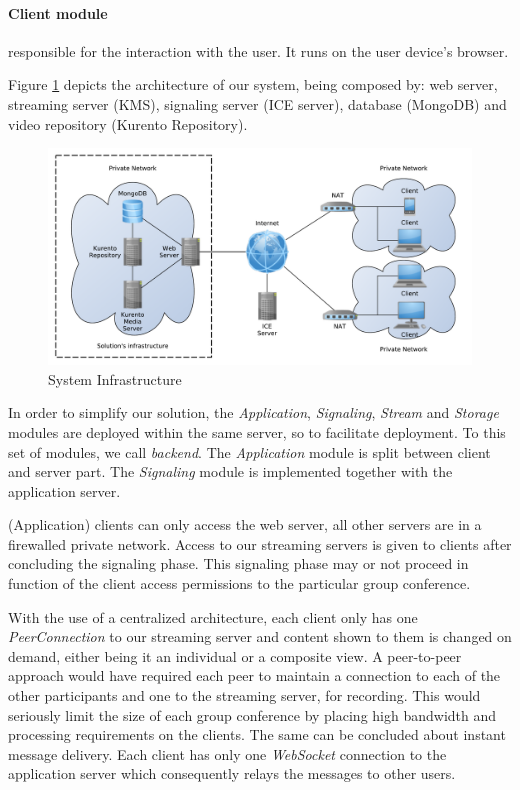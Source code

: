 \documentclass[10pt,conference]{IEEEtran}
\begin{document}
\paragraph{Client module} responsible for the interaction with the user. It runs on the user device's browser.


Figure \ref{fig:infrastructure} depicts the architecture of our system, being composed by: web server, streaming server (\gls{KMS}), signaling server (\gls{ICE} server), database (MongoDB) and video repository (Kurento Repository).

\begin{figure}
	\centering
	\includegraphics[width=\linewidth]{figures/infrastructure.pdf}
	\caption{System Infrastructure}
        \label{fig:infrastructure}
\end{figure}

In order to simplify our solution, the \emph{Application}, \emph{Signaling}, \emph{Stream} and \emph{Storage} modules are deployed within the same server, so to facilitate deployment.
To this set of modules, we call \emph{backend}.
The \emph{Application} module is split between client and server part.
The \emph{Signaling} module is implemented together with the application server.

(Application) clients can only access the web server, all other servers are in a firewalled private network.
Access to our streaming servers is given to clients after concluding the signaling phase.
This signaling phase may or not proceed in function of the client access permissions to the particular group conference.

With the use of a centralized architecture, each client only has one \emph{PeerConnection} to our streaming server and content shown to them is changed on demand, either being it an individual or a composite view. 
A peer-to-peer approach would have required each peer to maintain a connection to each of the other participants and one to the streaming server, for recording.
This would seriously limit the size of each group conference by placing high bandwidth and processing requirements on the clients. 
The same can be concluded about instant message delivery.
Each client has only one \emph{WebSocket} connection to the application server which consequently relays the messages to other users.
\end{document}
